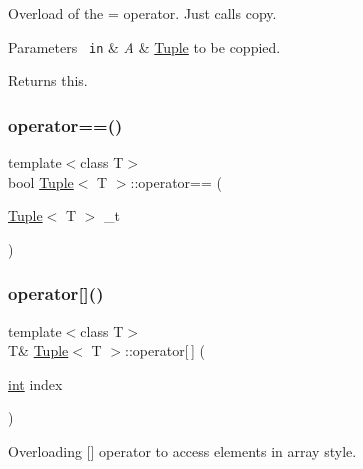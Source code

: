 Overload of the = operator. Just calls {\ttfamily copy}. 


\begin{DoxyParams}[1]{Parameters}
\mbox{\texttt{ in}}  & {\em A} & \mbox{\hyperlink{class_tuple}{Tuple}} to be coppied. \\
\hline
\end{DoxyParams}
\begin{DoxyReturn}{Returns}
this. 
\end{DoxyReturn}
\mbox{\label{class_tuple_ad8f90a7c0726fae5ac5651c4e16222cd}} 
\subsubsection{\texorpdfstring{operator==()}{operator==()}}
{\footnotesize\ttfamily template$<$class T$>$ \\
bool \mbox{\hyperlink{class_tuple}{Tuple}}$<$ T $>$\+::operator== (\begin{DoxyParamCaption}\item[{\mbox{\hyperlink{class_tuple}{Tuple}}$<$ T $>$}]{\+\_\+t }\end{DoxyParamCaption})\hspace{0.3cm}{\ttfamily [inline]}}

\mbox{\label{class_tuple_ae18a93053af932997709798b3fd5d12d}} 
\subsubsection{\texorpdfstring{operator[]()}{operator[]()}}
{\footnotesize\ttfamily template$<$class T$>$ \\
T\& \mbox{\hyperlink{class_tuple}{Tuple}}$<$ T $>$\+::operator\mbox{[}$\,$\mbox{]} (\begin{DoxyParamCaption}\item[{\mbox{\hyperlink{draw_8hh_aa620a13339ac3a1177c86edc549fda9b}{int}}}]{index }\end{DoxyParamCaption})\hspace{0.3cm}{\ttfamily [inline]}}



Overloading \mbox{[}\mbox{]} operator to access elements in array style. 


